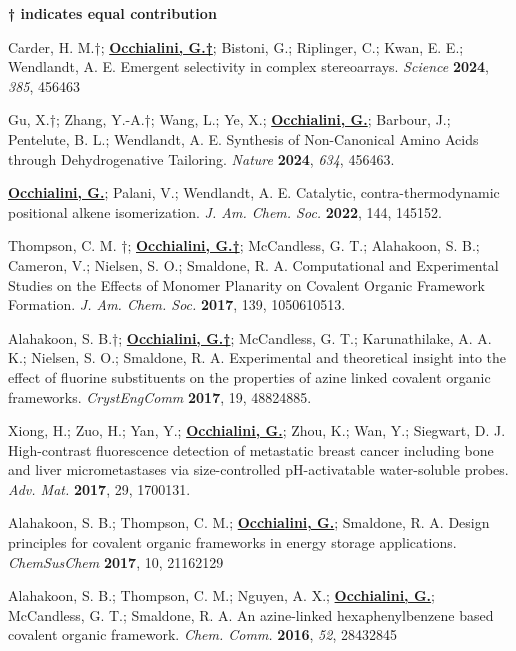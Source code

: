 
\begin{rSection}{}

  \textbf{† indicates equal contribution}
    
  Carder, H. M.†; \underline{\textbf{Occhialini, G.†}}; Bistoni, G.; Riplinger, C.; Kwan, E. E.; Wendlandt, A. E. Emergent selectivity in complex stereoarrays. \textit{Science} \textbf{2024}, \textit{385}, 456\textemdash{}463
  
  Gu, X.†; Zhang, Y.-A.†; Wang, L.; Ye, X.; \underline{\textbf{Occhialini, G.}}; Barbour, J.; Pentelute, B. L.; Wendlandt, A. E. Synthesis of Non-Canonical Amino Acids through Dehydrogenative Tailoring. \textit{Nature} \textbf{2024}, \textit{634}, 456\textemdash{}463.
  
  \underline{\textbf{Occhialini, G.}}; Palani, V.; Wendlandt, A. E. Catalytic, contra-thermodynamic positional alkene isomerization. \textit{J. Am. Chem. Soc.} \textbf{2022}, 144, 145\textemdash{}152.
  
  Thompson, C. M. †; \underline{\textbf{Occhialini, G.†}}; McCandless, G. T.; Alahakoon, S. B.; Cameron, V.; Nielsen, S. O.; Smaldone, R. A. Computational and Experimental Studies on the Effects of Monomer Planarity on Covalent Organic Framework Formation. \textit{J. Am. Chem. Soc.} \textbf{2017}, 139, 10506\textemdash{}10513.
  
  Alahakoon, S. B.†; \underline{\textbf{Occhialini, G.†}}; McCandless, G. T.; Karunathilake, A. A. K.; Nielsen, S. O.; Smaldone, R. A. Experimental and theoretical insight into the effect of fluorine substituents on the properties of azine linked covalent organic frameworks. \textit{CrystEngComm} \textbf{2017}, 19, 4882\textemdash{}4885.
  
  Xiong, H.; Zuo, H.; Yan, Y.; \underline{\textbf{Occhialini, G.}}; Zhou, K.; Wan, Y.; Siegwart, D. J. High-contrast fluorescence detection of metastatic breast cancer including bone and liver micrometastases via size-controlled pH-activatable water-soluble probes. \textit{Adv. Mat.} \textbf{2017}, 29, 1700131.
  
  Alahakoon, S. B.; Thompson, C. M.; \underline{\textbf{Occhialini, G.}}; Smaldone, R. A. Design principles for covalent organic frameworks in energy storage applications. \textit{ChemSusChem} \textbf{2017}, 10, 2116\textemdash{}2129

  Alahakoon, S. B.; Thompson, C. M.; Nguyen, A. X.; \underline{\textbf{Occhialini, G.}}; McCandless, G. T.; Smaldone, R. A. An azine-linked hexaphenylbenzene based covalent organic framework. \textit{Chem. Comm.} \textbf{2016}, \textit{52}, 2843\textemdash{}2845

\end{rSection}